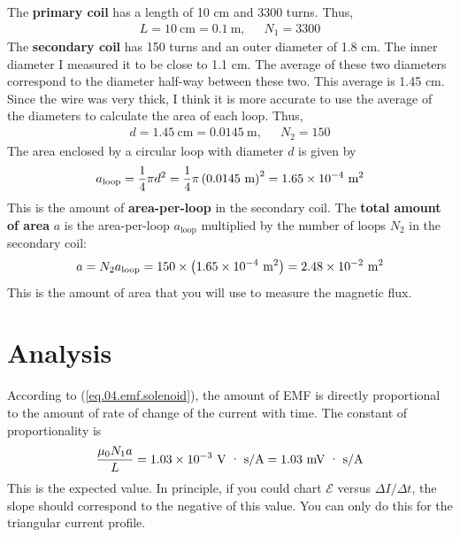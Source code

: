 The \textbf{primary coil} has a length of 10 cm and 3300 turns. Thus,
\begin{align}
	L = 10 \ \text{cm} = 0.1 \ \text{m,} && N_{1} = 3300
\end{align}
The \textbf{secondary coil} has 150 turns and an outer diameter of 1.8 cm. The inner diameter I measured it to be close to 1.1 cm. The average of these two diameters correspond to the diameter half-way between these two. This average is 1.45 cm. Since the wire was very thick, I think it is more accurate to use the average of the diameters to calculate the area of each loop. Thus,
\begin{align}
	d = 1.45 \ \text{cm} = 0.0145 \ \text{m,} && N_{2} = 150
\end{align}
The area enclosed by a circular loop with diameter $d$ is given by
\begin{equation}
	a_{\text{loop}} = \frac{1}{4} \pi d^{2} = \frac{1}{4} \pi \left(0.0145 \ \text{m}\right)^2 = 1.65 \times 10^{-4} \ \text{m\textsuperscript{2}}
\end{equation}
This is the amount of \textbf{area-per-loop} in the secondary coil. The \textbf{total amount of area} $a$ is the area-per-loop $a_{\text{loop}}$ multiplied by the number of loops $N_{2}$ in the secondary coil:
\begin{equation}
	a = N_{2} a_{\text{loop}} = 150 \times \left(1.65 \times 10^{-4} \ \text{m\textsuperscript{2}}\right) = 2.48 \times 10^{-2} \ \text{m\textsuperscript{2}}
\end{equation}
This is the amount of area that you will use to measure the magnetic flux.
%
\section{Analysis}
%
According to (\ref{eq.04.emf.solenoid}), the amount of EMF is directly proportional to the amount of rate of change of the current with time. The constant of proportionality is
\begin{equation}
	\frac{\mu_{0} N_{1} a}{L} = 1.03 \times 10^{-3} \ \text{V {\textperiodcentered} s/A} = 1.03 \ \text{mV {\textperiodcentered} s/A}
	\label{eq.04.slope}
\end{equation}
This is the expected value. In principle, if you could chart $\mathcal{E}$ versus $\Delta I / \Delta t$, the slope should correspond to the negative of this value. You can only do this for the triangular current profile.
%
